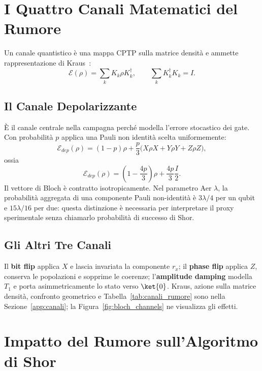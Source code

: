 \begin{onehalfspace}
\section{I Quattro Canali Matematici del Rumore}
\label{sec:canali}

Un canale quantistico è una mappa \acf{CPTP} sulla matrice densità e ammette
rappresentazione di Kraus~\cite{nielsenChuang2000}:
\begin{equation}
    \mathcal{E}(\rho)=\sum_kK_k\rho K_k^\dagger,
    \qquad \sum_kK_k^\dagger K_k=I.
    \label{eq:kraus}
\end{equation}

\subsection{Il Canale Depolarizzante}

È il canale centrale nella campagna perché modella l'errore stocastico dei gate.
Con probabilità $p$ applica una Pauli non identità scelta uniformemente:
\begin{equation}
    \mathcal{E}_{dep}(\rho)=(1-p)\rho+
    \frac{p}{3}\bigl(X\rho X+Y\rho Y+Z\rho Z\bigr),
    \label{eq:depolarizing}
\end{equation}
ossia
\begin{equation}
    \mathcal{E}_{dep}(\rho)=\left(1-\frac{4p}{3}\right)\rho
    +\frac{4p}{3}\frac{I}{2}.
    \label{eq:depolarizing_compact}
\end{equation}
Il vettore di Bloch è contratto isotropicamente. Nel parametro Aer $\lambda$,
la probabilità aggregata di una componente Pauli non-identità è
$3\lambda/4$ per un qubit e $15\lambda/16$ per due: questa distinzione è
necessaria per interpretare il proxy sperimentale senza chiamarlo probabilità
di successo di Shor.

\subsection{Gli Altri Tre Canali}

Il \textbf{bit flip} applica $X$ e lascia invariata la componente $r_x$; il
\textbf{phase flip} applica $Z$, conserva le popolazioni e sopprime le
coerenze; l'\textbf{amplitude damping} modella $T_1$ e porta asimmetricamente
lo stato verso $\ket{0}$. Kraus, azione sulla matrice densità, confronto
geometrico e Tabella~\ref{tab:canali_rumore} sono nella
Sezione~\ref{app:canali}; la Figura~\ref{fig:bloch_channels} ne visualizza gli
effetti.

\section{Impatto del Rumore sull'Algoritmo di Shor}


\end{onehalfspace}
